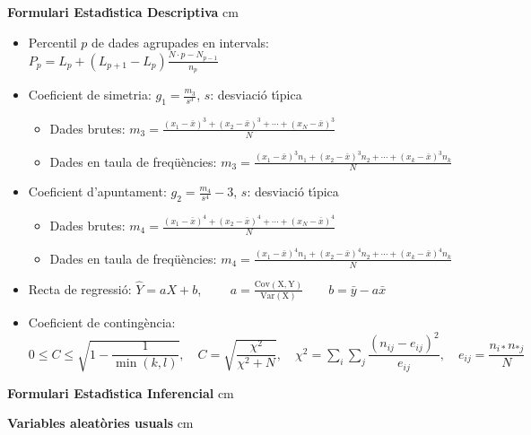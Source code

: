 \documentclass[a4paper,10pt]{article}
\begin{document}
\newpage

{\footnotesize

\textbf{Formulari Estad\'{\i}stica Descriptiva}
 cm

\begin{itemize}
\item Percentil $p$ de dades agrupades en intervals:
$
\displaystyle
P_p=L_p + (L_{p+1}-L_p) \frac{N \cdot p - N_{p-1}}{n_p}
$

\item Coeficient de simetria: $g_1=\frac{m_3}{s^3}$, $s$: desviaci\'o t\'{\i}pica
\begin{itemize}
\item Dades brutes:
$
\displaystyle
m_3=\frac{(x_1-\bar{x})^3+(x_2-\bar{x})^3+\cdots+(x_N-\bar{x})^3}{N}
$
\item Dades en taula de freq\"u\`encies:
$
\displaystyle
m_3=\frac{(x_1-\bar{x})^3 n_1+(x_2-\bar{x})^3 n_2+\cdots+(x_k-\bar{x})^3 n_k}{N}
$
\end{itemize}

\item Coeficient d'apuntament: $g_2=\frac{m_4}{s^4} - 3$, $s$: desviaci\'o t\'{\i}pica
\begin{itemize}
\item Dades brutes:
$
\displaystyle
m_4=\frac{(x_1-\bar{x})^4+(x_2-\bar{x})^4+\cdots+(x_N-\bar{x})^4}{N}
$
\item Dades en taula de freq\"u\`encies:
$
\displaystyle
m_4=\frac{(x_1-\bar{x})^4 n_1+(x_2-\bar{x})^4 n_2+\cdots+(x_k-\bar{x})^4 n_k}{N}
$
\end{itemize}

\item Recta de regressi\'o: $\hat{Y}=aX+b$, $\qquad 
a=\frac{\mathrm{Cov(X, Y)}}{\mathrm{Var(X)}} \qquad b=\bar{y}-a \bar{x}
$

\item Coeficient de conting\`encia:
$
\displaystyle
0\leq C \leq \sqrt{1-\dfrac{1}{\min(k,l)}},\quad C=\sqrt{\dfrac {\chi^2}{\chi^2+N}},\quad \chi^2=\sum_i \sum_j \dfrac {(n_{ij}-e_{ij})^2}{e_{ij}},\quad e_{ij}=\dfrac {n_{i*}n_{*j}}{N}
$


\end{itemize}

\textbf{Formulari Estad\'{\i}stica Inferencial}
 cm

\textbf{Variables aleat\`ories usuals}
 cm

}
\end{document}
